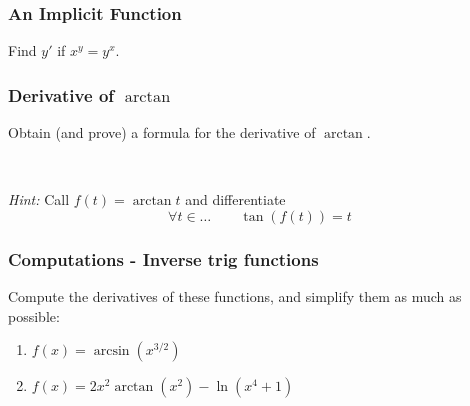 \documentclass[14pt]{beamer}
\newcommand {\DS} [1] {${\displaystyle #1}$}
\begin{document}

\begin{frame}[t]
\frametitle{An Implicit Function}

\vspace{5mm} 
\begin{block}{}
Find $y'$ if $x^y=y^x$.
\end{block}
\end{frame}



\begin{frame}[t]
\frametitle{Derivative of $\arctan$}

\begin{block}{}
Obtain (and prove) a formula for the derivative of $\arctan$.
\end{block}

\

\emph{Hint:}  Call \DS{f(t) = \arctan t} and differentiate
	$$
		\forall t \in \ldots \quad \quad \tan ( f(t)) = t
	$$
\end{frame}
\begin{frame}[t]
\frametitle{Computations - Inverse trig functions}


Compute the derivatives of these functions, and simplify them as much as possible:
	\begin{enumerate}
		\item  \DS{f(x) = \arcsin \left( x^{3/2}\right) }
		\vfill
		\item  \DS{ f(x)=2x^2 \arctan (x^2) - \ln (x^4+1) }
		\vfill
	\end{enumerate}

\end{frame}
\end{document}
